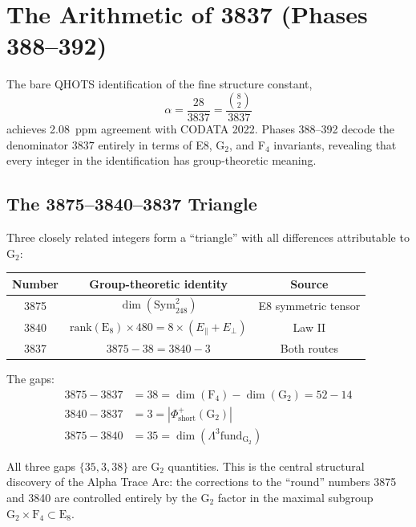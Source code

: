 \documentclass[aps,prd,twocolumn,superscriptaddress,floatfix,nofootinbib]{revtex4-2}
\theoremstyle{definition}
\theoremstyle{remark}
\begin{document}

\section{The Arithmetic of 3837 (Phases 388--392)}
\label{sec:alpha-arithmetic}

The bare QHOTS identification of the fine structure constant,
\begin{equation}
    \alpha = \frac{28}{3837} = \frac{\binom{8}{2}}{3837}
\end{equation}
achieves 2.08~ppm agreement with CODATA 2022. Phases 388--392 decode the
denominator $3837$ entirely in terms of E8, G$_2$, and F$_4$ invariants,
revealing that every integer in the identification has group-theoretic meaning.

\subsection{The 3875--3840--3837 Triangle}

Three closely related integers form a ``triangle'' with all differences
attributable to G$_2$:

\begin{center}
\begin{tabular}{ccc}
\toprule
Number & Group-theoretic identity & Source \\
\midrule
3875 & $\dim(\text{Sym}^2_{248})$ & E8 symmetric tensor \\
3840 & $\text{rank}(\text{E}_8) \times 480 = 8 \times (E_\parallel + E_\perp)$ & Law II \\
3837 & $3875 - 38 = 3840 - 3$ & Both routes \\
\bottomrule
\end{tabular}
\end{center}

\noindent The gaps:
\begin{align}
    3875 - 3837 &= 38 = \dim(\text{F}_4) - \dim(\text{G}_2) = 52 - 14 \\
    3840 - 3837 &= 3 = |\Phi^+_{\text{short}}(\text{G}_2)| \\
    3875 - 3840 &= 35 = \dim(\Lambda^3 \text{fund}_{\text{G}_2})
\end{align}

All three gaps $\{35, 3, 38\}$ are G$_2$ quantities. This is the central
structural discovery of the Alpha Trace Arc: the corrections to the ``round''
numbers 3875 and 3840 are controlled entirely by the G$_2$ factor in the maximal
subgroup $\text{G}_2 \times \text{F}_4 \subset \text{E}_8$.
\end{document}
